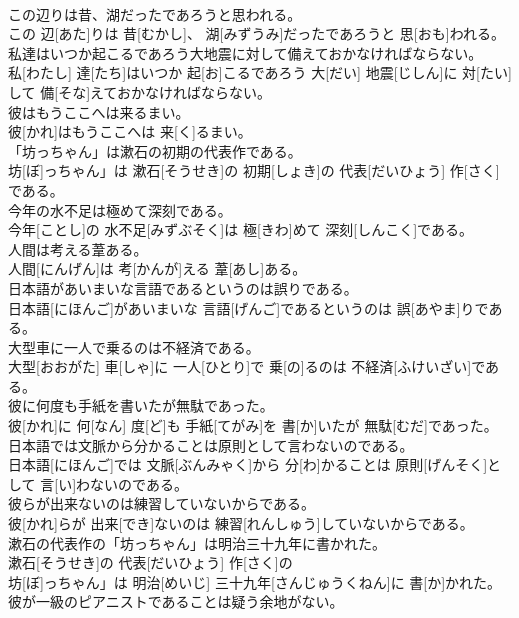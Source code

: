 \documentclass[8pt]{extreport}
\begin{document}
\begin{CJK}{UTF8}{min}
\\	この辺りは昔、湖だったであろうと思われる。	
\\	この 辺[あた]りは 昔[むかし]、 湖[みずうみ]だったであろうと 思[おも]われる。
\\	私達はいつか起こるであろう大地震に対して備えておかなければならない。	
\\	私[わたし] 達[たち]はいつか 起[お]こるであろう 大[だい] 地震[じしん]に 対[たい]して 備[そな]えておかなければならない。
\\	彼はもうここへは来るまい。	
\\	彼[かれ]はもうここへは 来[く]るまい。
\\	「坊っちゃん」は漱石の初期の代表作である。	
\\	坊[ぼ]っちゃん」は 漱石[そうせき]の 初期[しょき]の 代表[だいひょう] 作[さく]である。
\\	今年の水不足は極めて深刻である。	
\\	今年[ことし]の 水不足[みずぶそく]は 極[きわ]めて 深刻[しんこく]である。
\\	人間は考える葦ある。	
\\	人間[にんげん]は 考[かんが]える 葦[あし]ある。
\\	日本語があいまいな言語であるというのは誤りである。	
\\	日本語[にほんご]があいまいな 言語[げんご]であるというのは 誤[あやま]りである。
\\	大型車に一人で乗るのは不経済である。	
\\	大型[おおがた] 車[しゃ]に 一人[ひとり]で 乗[の]るのは 不経済[ふけいざい]である。
\\	彼に何度も手紙を書いたが無駄であった。	
\\	彼[かれ]に 何[なん] 度[ど]も 手紙[てがみ]を 書[か]いたが 無駄[むだ]であった。
\\	日本語では文脈から分かることは原則として言わないのである。	
\\	日本語[にほんご]では 文脈[ぶんみゃく]から 分[わ]かることは 原則[げんそく]として 言[い]わないのである。
\\	彼らが出来ないのは練習していないからである。	
\\	彼[かれ]らが 出来[でき]ないのは 練習[れんしゅう]していないからである。
\\	漱石の代表作の「坊っちゃん」は明治三十九年に書かれた。	
\\	漱石[そうせき]の 代表[だいひょう] 作[さく]の
\\	坊[ぼ]っちゃん」は 明治[めいじ] 三十九年[さんじゅうくねん]に 書[か]かれた。
\\	彼が一級のピアニストであることは疑う余地がない。	

\end{CJK}
\end{document}
